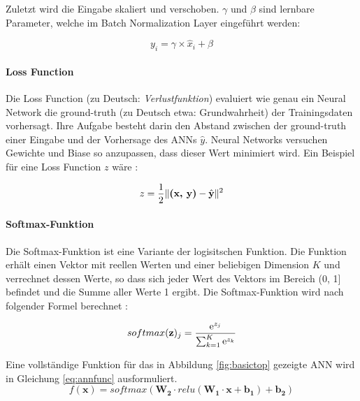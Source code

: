 Zuletzt wird die Eingabe skaliert und verschoben. $\gamma$ und $\beta$ sind lernbare Parameter, welche im Batch Normalization Layer eingeführt werden: 

\begin{equation}
	y_i = \gamma \times \hat{x}_i + \beta
\end{equation}


\paragraph{Loss Function}

Die Loss Function (zu Deutsch: \textit{Verlustfunktion}) evaluiert wie genau ein Neural Network die ground-truth (zu Deutsch etwa: Grundwahrheit) der Trainingsdaten vorhersagt. Ihre Aufgabe besteht darin den Abstand zwischen der ground-truth  einer Eingabe  und der Vorhersage des ANNs $\hat{y}$. Neural Networks versuchen Gewichte und Biase so anzupassen, dass dieser Wert minimiert wird. Ein Beispiel für eine Loss Function $z$ wäre \parencite{Wu.2017}:

\begin{equation}
z = \frac{1}{2}\|\textbf{(x, y)} - \hat{\textbf{y}}\|^2
\end{equation}


\paragraph{Softmax-Funktion}

Die Softmax-Funktion ist eine Variante der logisitschen Funktion. Die Funktion erh\"alt einen Vektor  mit reellen Werten und einer beliebigen Dimension $K$ und verrechnet dessen Werte, so dass sich jeder Wert des Vektors  im Bereich (0, 1] befindet und die Summe aller Werte 1 ergibt. Die Softmax-Funktion wird nach folgender Formel berechnet \parencite{Goodfellow-et-al-2016}:

\begin{equation}
softmax(\textbf{z})_j = \frac{\mathrm{e}^{z_j}}{\sum_{k=1}^K \mathrm{e}^{z_k}}
\end{equation}

Eine vollständige Funktion für das in Abbildung \ref{fig:basictop} gezeigte ANN wird in Gleichung \ref{eq:annfunc} ausformuliert.
\begin{equation}
f(\mathbf{x}) = softmax(\mathbf{W_2} \cdot relu(\mathbf{W_1} \cdot \mathbf{x} + \mathbf{b_1}) + \mathbf{b_2} )
\label{eq:annfunc}
\end{equation}


